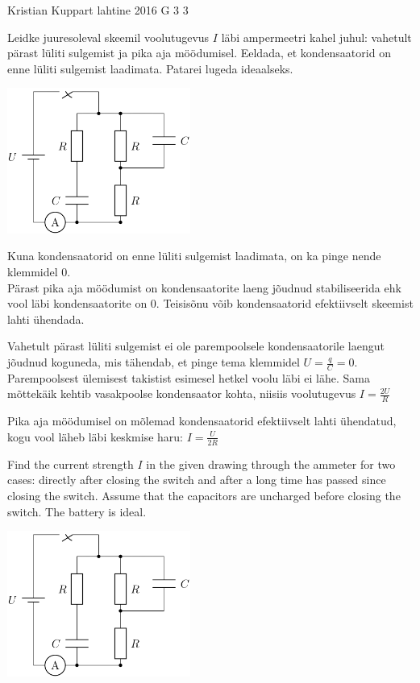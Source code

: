 {Kristian Kuppart} %
{lahtine} %
{2016} %
{G 3} %
{3} %
{
\ifStatement

Leidke juuresoleval skeemil voolutugevus $I$ läbi ampermeetri kahel juhul: vahetult pärast lüliti sulgemist ja pika aja möödumisel. Eeldada, et kondensaatorid on enne lüliti sulgemist laadimata. Patarei lugeda ideaalseks.
\begin{center}
\includegraphics[width=0.45\textwidth]{2016-lahg-03-skeemjoonis.png}
\end{center}
\fi


\ifHint
Kuna kondensaatorid on enne lüliti sulgemist laadimata, on ka pinge nende klemmidel $0$.\\
Pärast pika aja möödumist on kondensaatorite laeng jõudnud stabiliseerida ehk vool läbi kondensaatorite on $0$. Teisisõnu võib kondensaatorid efektiivselt skeemist lahti ühendada.
\fi


\ifSolution
Vahetult pärast lüliti sulgemist ei ole parempoolsele kondensaatorile laengut jõudnud koguneda, mis tähendab, et pinge tema klemmidel $U=\frac{q}{C}=0$. Parempoolsest ülemisest takistist esimesel hetkel voolu läbi ei lähe. Sama  mõttekäik kehtib vasakpoolse kondensaator kohta, niisiis voolutugevus $I=\frac{2U}{R}$ 

Pika aja möödumisel on mõlemad kondensaatorid efektiivselt lahti ühendatud, kogu vool läheb läbi keskmise haru: $I=\frac{U}{2R}$
\fi


\ifEngStatement
Find the current strength $I$ in the given drawing through the ammeter for two cases: directly after closing the switch and after a long time has passed since closing the switch. Assume that the capacitors are uncharged before closing the switch. The battery is ideal. 
\begin{center}
\includegraphics[width=0.45\textwidth]{2016-lahg-03-skeemjoonis}
\end{center}
\fi


}
